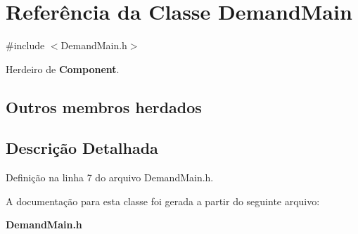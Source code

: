 \section{Referência da Classe Demand\+Main}
\label{class_demand_main}


{\ttfamily \#include $<$Demand\+Main.\+h$>$}



Herdeiro de {\bf Component}.

\subsection*{Outros membros herdados}


\subsection{Descrição Detalhada}


Definição na linha 7 do arquivo Demand\+Main.\+h.



A documentação para esta classe foi gerada a partir do seguinte arquivo\+:\begin{DoxyCompactItemize}
\item 
{\bf Demand\+Main.\+h}\end{DoxyCompactItemize}
